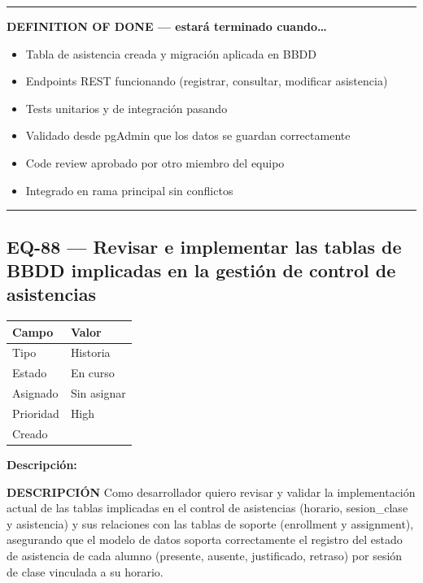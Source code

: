 \documentclass[
  spanish,
  11pt,
]{report}
\newcounter{none} %
\providecommand{\tightlist}{%
  \setlength{\itemsep}{0pt}\setlength{\parskip}{0pt}}
\begin{document}
\begin{center}\rule{0.5\linewidth}{0.5pt}\end{center}

\textbf{DEFINITION OF DONE --- estará terminado cuando\ldots{}}

\begin{itemize}
\tightlist
\item
  Tabla de asistencia creada y migración aplicada en BBDD
\item
  Endpoints REST funcionando (registrar, consultar, modificar
  asistencia)
\item
  Tests unitarios y de integración pasando
\item
  Validado desde pgAdmin que los datos se guardan correctamente
\item
  Code review aprobado por otro miembro del equipo
\item
  Integrado en rama principal sin conflictos
\end{itemize}

\begin{center}\rule{0.5\linewidth}{0.5pt}\end{center}

\subsection{EQ-88 --- Revisar e implementar las tablas de BBDD
implicadas en la gestión de control de
asistencias}\label{eq-88-revisar-e-implementar-las-tablas-de-bbdd-implicadas-en-la-gestiuxf3n-de-control-de-asistencias}

{\def\LTcaptype{none} %
\begin{longtable}[]{@{}ll@{}}
\toprule\noalign{}
Campo & Valor \\
\midrule\noalign{}
\endhead
\bottomrule\noalign{}
\endlastfoot
Tipo & Historia \\
Estado & En curso \\
Asignado & Sin asignar \\
Prioridad & High \\
Creado & \\
\end{longtable}
}

\textbf{Descripción:}

\textbf{DESCRIPCIÓN} Como desarrollador quiero revisar y validar la
implementación actual de las tablas implicadas en el control de
asistencias (horario, sesion\_clase y asistencia) y sus relaciones con
las tablas de soporte (enrollment y assignment), asegurando que el
modelo de datos soporta correctamente el registro del estado de
asistencia de cada alumno (presente, ausente, justificado, retraso) por
sesión de clase vinculada a su horario.
\end{document}
